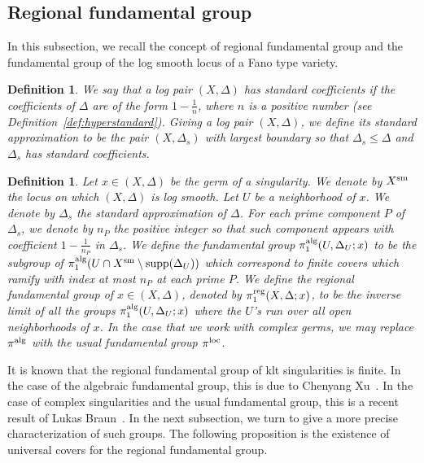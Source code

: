 \documentclass{amsart}
\newcommand{\supp}{\operatorname{supp}}
\newtheorem{definition}[theorem]{Definition}
\theoremstyle{remark}
\numberwithin{equation}{section}
\begin{document}
\subsection{Regional fundamental group}\label{subsec:regional-fund}
In this subsection, we recall the concept of regional fundamental group and the fundamental group of the log smooth locus of a Fano type variety.

\begin{definition}{\em 
We say that a log pair $(X,\Delta)$ has {\em standard coefficients}
if the coefficients of $\Delta$ are of the form $1-\frac{1}{n}$,
where $n$ is a positive number (see Definition~\ref{def:hyperstandard}).
Giving a log pair $(X,\Delta)$, we define its {\em standard approximation}
to be the pair $(X,\Delta_s)$ with largest boundary so that
$\Delta_s\leq \Delta$ and $\Delta_s$ has standard coefficients.
}
\end{definition}

\begin{definition}{\em 
Let $x\in (X,\Delta)$ be the germ of a singularity.
We denote by $X^{\rm sm}$ the locus on which $(X,\Delta)$ is log smooth.
Let $U$ be a neighborhood of $x$.
We denote by $\Delta_s$ the standard approximation of $\Delta$.
For each prime component $P$ of $\Delta_s$, 
we denote by $n_P$ the positive integer so that such component
appears with coefficient $1-\frac{1}{n_P}$ in $\Delta_s$.
We define the fundamental group $\pi^{\rm alg}_1(U,\Delta_U;x)$
to be the subgroup of $\pi^{\rm alg}_1(U\cap X^{\rm sm}\setminus \supp(\Delta_U))$
which correspond to finite covers which ramify with index 
at most $n_P$ at each prime $P$.
We define the {\em regional fundamental group} of $x\in (X,\Delta)$,
denoted by $\pi_1^{\rm reg}(X,\Delta;x)$, to be the inverse limit 
of all the groups $\pi^{\rm alg}_1(U,\Delta_U;x)$ where the $U$'s run over all open neighborhoods of $x$.
In the case that we work with complex germs, we may replace $\pi^{\rm alg}$ with the usual fundamental group $\pi^{\rm loc}$.}
\end{definition} 

It is known that the regional fundamental group of klt singularities is finite.
In the case of the algebraic fundamental group, this is due to Chenyang Xu~\cite{Xu14}.
In the case of complex singularities and the usual fundamental group, this is a recent result of Lukas Braun~\cite{Bra20}. In the next subsection, we turn to give a more precise characterization of such groups. 
The following proposition is the existence of universal covers for the regional fundamental group.
\end{document}

